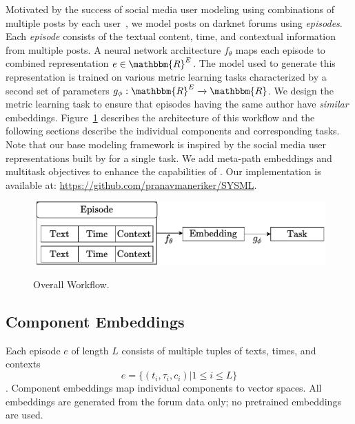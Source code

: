 \label{sec:sysml:method}
Motivated by the success of social media user modeling using combinations of multiple posts by each user~\cite{andrews2019learning,noorshams2020ties}, we model posts on darknet forums using \textit{episodes}.
Each \textit{episode} consists of the textual content, time, and contextual information from multiple posts. 
A neural network architecture $f_{\theta}$ maps each episode to combined representation $e \in \mathbbm{R}^E$.
The model used to generate this representation is trained on various metric learning tasks characterized by a second set of parameters $g_{\phi}: \mathbbm{R}^E \xrightarrow[]{} \mathbbm{R}$.
We design the metric learning task to ensure that episodes having the same author have \textit{similar} embeddings.
Figure~\ref{fig:main_workflow} describes the architecture of this workflow and the following sections describe the individual components and corresponding tasks. 
Note that our base modeling framework is inspired by the social media user representations built by \citet{andrews2019learning} for a single task. 
We add meta-path embeddings and multitask objectives to enhance the capabilities of 
\SYSMLmethodname{}. 
Our implementation is available at: \url{https://github.com/pranavmaneriker/SYSML}.

\begin{figure}[!htbp]
    \centering
    \includegraphics[width=\linewidth,alt={Flowchart showing \SYSMLmethodname{} workflow.}]{sysml/figures/MainFlowchart.pdf}
    \caption{Overall \SYSMLmethodname{} Workflow.}
    \label{fig:main_workflow}
\end{figure}

\subsection{Component Embeddings}
Each episode $e$ of length $L$ consists of multiple tuples of texts, times, and contexts 
\[
    e = \{(t_i, \tau_i, c_i) | 1 \leq i \leq L\} 
\]. 
Component embeddings map individual components to vector spaces. 
All embeddings are generated from the forum data only; no pretrained embeddings are used.

